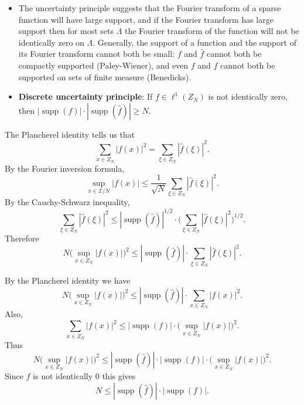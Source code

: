 \documentclass{slides}
\DeclareMathOperator{\supp}{supp}
\begin{document}
\begin{slide}
\begin{itemize}
\item The uncertainty principle suggests that the Fourier transform of
a
sparse function will have large support, and if the Fourier transform
has large support then for most sets $\Lambda$ the Fourier transform
of the function will not be identically zero on $\Lambda$.
Generally, the support of a function and the support of its Fourier
transform cannot both be small: $f$ and $\hat{f}$
cannot both be compactly supported (Paley-Wiener),
and even $f$ and $\hat{f}$ cannot both be supported on sets
of finite measure (Benedicks).

\item \textbf{Discrete uncertainty principle}: If $f \in \ell^1(Z_N)$ is not
identically zero, then $|\supp(f)|\cdot |\supp(\hat{f})| \geq N$.
\end{itemize}
\end{slide}

\begin{slide}
The Plancherel identity tells us that
\[
\sum_{x \in Z_N} |f(x)|^2 = \sum_{\xi \in Z_N}|\hat{f}(\xi)|^2.
\]
By the Fourier inversion formula,
\[
\sup_{x \in \mathbb{Z}/N}|f(x)| \leq \frac{1}{\sqrt{N}}\sum_{\xi \in Z_N}|\hat{f}(\xi)|^2.
\]
By the Cauchy-Schwarz inequality,
\[
\sum_{\xi \in Z_N}|\hat{f}(\xi)|^2 \leq |\supp(\hat{f})|^{1/2}
\cdot \bigg(\sum_{\xi \in Z_N}|\hat{f}(\xi)|^2\bigg)^{1/2}.
\]
Therefore 
\[
N\bigg(\sup_{x \in Z_N} |f(x)| \bigg)^2 \leq
|\supp(\hat{f})|
\cdot \sum_{\xi \in Z_N}|\hat{f}(\xi)|^2.
\]
\end{slide}
\begin{slide}
By the Plancherel identity we have
\[
N\bigg(\sup_{x \in Z_N} |f(x)| \bigg)^2 \leq
|\supp(\hat{f})|
\cdot \sum_{x \in Z_N}|f(x)|^2.
\]
Also,
\[
\sum_{x\in Z_N}|f(x)|^2 \leq
|\supp(f)|\cdot \big( \sup_{x\in Z_N}|f(x)| \big)^2.
\]
Thus
\[
N\bigg(\sup_{x \in Z_N} |f(x)| \bigg)^2 \leq
|\supp(\hat{f})|
\cdot
|\supp(f)|\cdot \big( \sup_{x\in Z_N}|f(x)| \big)^2.
\]
Since $f$ is not identically $0$ this gives
\[
N \leq |\supp(\hat{f})|
\cdot
|\supp(f)|.
\]
\end{slide}
\end{document}

